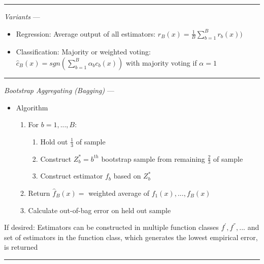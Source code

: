 {\color{lightgray}\hrule height 0.001mm}

\emph{Variants} --- 
\begin{itemize}
    \item Regression: Average output of all estimators: $\hat{r}_B(x) = \frac{1}{B} \sum_{b=1}^B r_b(x) )$ 
    \item Classification: Majority or weighted voting:
    $\hat{c}_B(x) = sgn( \sum_{b=1}^B \alpha_b c_b(x) )$ with majority voting if $\alpha = 1$
\end{itemize}

{\color{lightgray}\hrule height 0.001mm}

\emph{Bootstrap Aggregating (Bagging)} --- 
\begin{itemize}
    \item Algorithm
    \begin{enumerate}
        \item For $b = 1, ..., B$:
        \begin{enumerate}
            \item Hold out $\frac{1}{3}$ of sample
            \item Construct $Z^{*}_b = b^{th}$ bootstrap sample from remaining $\frac{2}{3}$ of sample
            \item Construct estimator $f_b$ based on $Z^{*}_b$ 
        \end{enumerate}
        \item Return $\hat{f}_B(x) =$ weighted average of $f_1(x), ..., f_B(x)$
        \item Calculate out-of-bag error on held out sample
    \end{enumerate}
\end{itemize}
If desired: Estimators can be constructed in multiple function classes $f^{'}, f^{''}, ...$ and set of estimators in the function class, which generates the lowest empirical error, is returned

{\color{lightgray}\hrule height 0.001mm}

